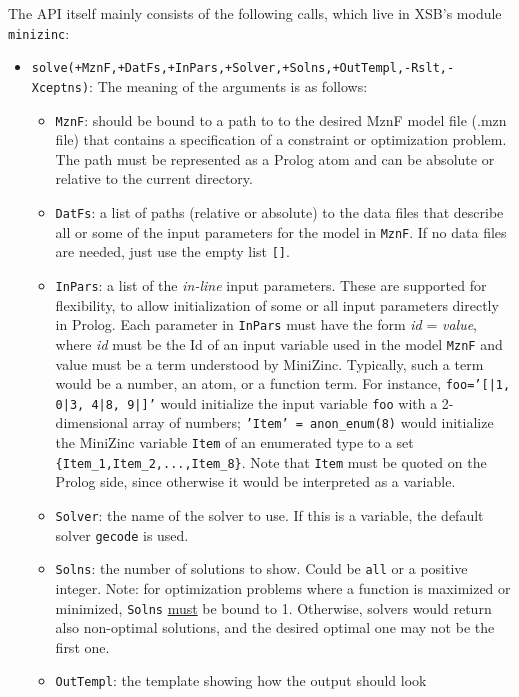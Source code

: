 The API itself mainly consists of the following calls, which live in XSB's
module \texttt{minizinc}: 
\begin{itemize}
\item
  \texttt{solve(+MznF,+DatFs,+InPars,+Solver,+Solns,+OutTempl,-Rslt,-Xceptns)}: 
  The meaning of the arguments is as follows:
  \begin{itemize}
  \item    \texttt{MznF}: should be bound to a path to to the desired MznF
    model file (.mzn file) that contains a specification of a constraint or
    optimization problem. The path must be represented as a Prolog atom and
    can be absolute or relative to the current directory.
  \item \texttt{DatFs}: a list of paths (relative or absolute)  
    to the data files that describe all or some of the input parameters for
    the model in \texttt{MznF}.
    If no data files are needed, just use the empty list \texttt{[]}. 
  \item \texttt{InPars}: a list of the \emph{in-line} input parameters.
    These are supported for flexibility, to allow initialization of some or
    all input parameters directly in Prolog.
    Each parameter in \texttt{InPars} must have the form \emph{id} =
    \emph{value}, where \emph{id} must be the Id of an input variable used in
    the model \texttt{MznF} and value must be a term understood by MiniZinc.
    Typically, such a term would be a number, an atom, or a function term.
    For instance,  \texttt{foo='[|1, 0|3, 4|8, 9|]'} would initialize the input
    variable \texttt{foo} with a 2-dimensional array of numbers;
    \texttt{'Item' = anon\_enum(8)}  would initialize the MiniZinc variable
    \texttt{Item}  of an enumerated type to a set
    \texttt{\{Item\_1,Item\_2,...,Item\_8\}}.  Note that \texttt{Item} must
    be quoted on the Prolog side, since otherwise it would be interpreted
    as a variable.
  \item \texttt{Solver}: the name of the solver to use. If this is a variable,
    the default solver \texttt{gecode} is used. 
  \item \texttt{Solns}: the number of solutions to show. 
    Could be \texttt{all} or a positive integer.
    Note: for optimization problems where a function is maximized or minimized,
    \texttt{Solns} \underline{must} be bound to 1. Otherwise, solvers would
    return also non-optimal solutions, and the desired optimal one may not
    be the first one.
  \item \texttt{OutTempl}: the template showing how the output should look

\end{itemize}
\end{itemize}
